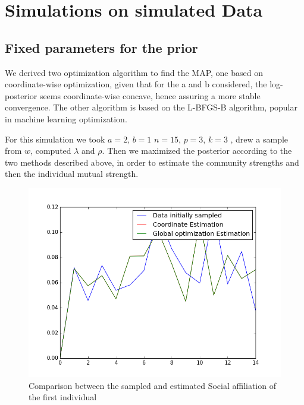 \documentclass[12pt]{ociamthesis}  %
\begin{document}
	\section{Simulations on simulated Data}
	\subsection{Fixed parameters for the prior}
	We derived two optimization algorithm to find the MAP, one based on coordinate-wise optimization, given that for the a and b considered, the log-posterior seems coordinate-wise concave, hence assuring a more stable convergence. The other algorithm is based on the L-BFGS-B algorithm, popular in machine learning optimization.
	
	For this simulation we took $a = 2$, $b = 1$ $n = 15$, $p = 3$, $k = 3$ , drew a sample from $w$, computed $\lambda$ and $\rho$. Then we maximized the posterior according to the two methods described above, in order to estimate the community strengths and then the individual mutual strength. 


	\begin{figure}
		\centering
		\includegraphics[width=\textwidth,height=\textheight,keepaspectratio]{LambdaEstimation}
		\caption{Comparison between the sampled and estimated Social affiliation of the first individual}
		\label{label-image1}
	\end{figure}
	
\end{document}
